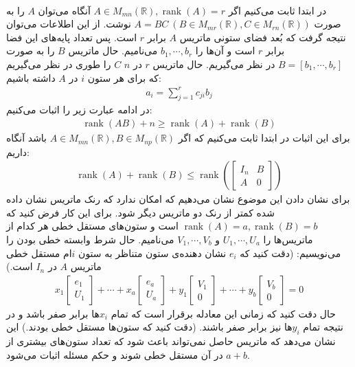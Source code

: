 \\
در ابتدا ثابت می‌کنیم اگر
$A \in M_{mn} (\mathbb{R}), \operatorname{rank}(A) = r$
آنگاه می‌توان
$A$
را به صورت
$A = BC ~ (B \in M_{mr} (\mathbb{R}), C \in M_{rn} (\mathbb{R}))$
نوشت. از این اطلاعات می‌توان نتیجه گرفت که بُعد فضای ستونی ماتریس
$A$
برابر
$r$
است. پس تعداد پایه‌های این فضا برابر
$r$
است و آن‌ها را
$b_1, \cdots, b_r$
می‌نامیم. حال ماتریس
$B$
را به صورت
$B = [b_1, \cdots, b_r]$
در نظر می‌گیریم.
حال ماتریس
$r$
در
$n$
$C$
را طوری در نظر می‌گیریم که برای هر ستون
$i$ در $A$
داشته باشیم:
\begin{gather*}
    a_i = \sum_{j=1}^{r} c_{ji} b_j
\end{gather*}
در ادامه عبارت زیر را اثبات می‌کنیم:
\begin{gather*}
    \operatorname{rank}(AB) + n \geq \operatorname{rank}(A) + \operatorname{rank}(B)
\end{gather*}
برای این اثبات در ابتدا ثابت می‌کنیم که اگر
$A \in M_{mn} (\mathbb{R}), B \in M_{np} (\mathbb{R})$
باشد آنگاه داریم:
\begin{gather*}
    \operatorname{rank}(A) + \operatorname{rank}(B) \leq \operatorname{rank}(
    \begin{bmatrix}
        I_n & B \\
        A & 0
    \end{bmatrix})
\end{gather*}
برای نشان دادن این موضوع نشان می‌دهیم که امکان ندارد که رنک ماتریس نشان داده شده کمتر از رنک دو ماتریس دیگر شود.
برای این کار فرض کنید که
$\operatorname{rank}(A) = a, \operatorname{rank}(B) = b$
است و ستون‌های مستقل خطی هر کدام از ماتریس‌ها را
$U_1, \cdots, U_a$ و $V_1, \cdots, V_b$
می‌نامیم. حال شرط وابسته خطی بودن را می‌نویسیم:
(دقت کنید که
$e_i$
نشان دهنده‌ی ستون متناظر به ستون
$i$ام
مستقل خطی ماتریس
$A$
در
$I_n$
است.)
\begin{gather*}
    x_1
    \begin{bmatrix}
        e_1 \\ U_1
    \end{bmatrix}
    + \cdots +
    x_a
    \begin{bmatrix}
        e_a \\ U_a
    \end{bmatrix}
    +
    y_1
    \begin{bmatrix}
        V_1 \\ 0
    \end{bmatrix}
    + \cdots +
    y_b
    \begin{bmatrix}
        V_b \\ 0
    \end{bmatrix}
    = 0
\end{gather*}
حال دقت کنید که زمانی این معادله برقرار است که تمام
$x_i$ها
برابر صفر باشد و در نتیجه تمام
$y_i$ها
نیز برابر صفر باشند.
(دقت کنید که ستون‌ها مستقل خطی بودند.)
این نشان می‌دهد که ماتریس حاصل نمی‌تواند باعث شود که تعداد ستون‌های بیشتری از
$a + b$
در آن مستقل خطی شوند و حکم مسئله اثبات می‌شود.

